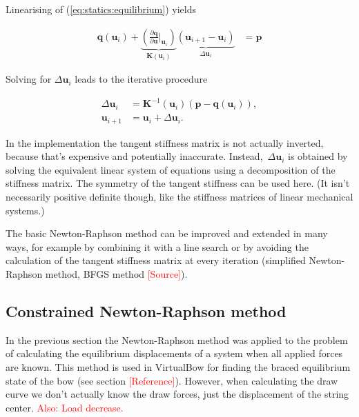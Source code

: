 Linearising of (\ref{eq:statics:equilibrium}) yields

\begin{align}
\boldsymbol{q}(\boldsymbol{u}_i) +
\underbrace{
\left(\frac{\partial \boldsymbol{q}}{\partial \boldsymbol{u}}\bigg \vert_{\boldsymbol{u}_i}\right)
}_{\boldsymbol{K}(\boldsymbol{u}_i)}
\underbrace{
(\boldsymbol{u}_{i+1} - \boldsymbol{u}_i)
}_{\Delta\boldsymbol{u}_i} &= \boldsymbol{p}
\end{align}

Solving for $\Delta\boldsymbol{u}_i$ leads to the iterative procedure

\begin{align}
\Delta\boldsymbol{u}_i &= \boldsymbol{K}^{-1}(\boldsymbol{u}_i)\left(\boldsymbol{p} - \boldsymbol{q}(\boldsymbol{u}_i)\right),\\
\boldsymbol{u}_{i+1} &= \boldsymbol{u}_i + \Delta\boldsymbol{u}_i.\label{eq:statics:newton_iteration}
\end{align}

In the implementation the tangent stiffness matrix is not actually inverted, because that's expensive and potentially inaccurate. Instead,~$\Delta\boldsymbol{u}_i$ is obtained by solving the equivalent linear system of equations using a decomposition of the stiffness matrix. The symmetry of the tangent stiffness can be used here. (It isn't necessarily positive definite though, like the stiffness matrices of linear mechanical systems.)

The basic Newton-Raphson method can be improved and extended in many ways, for example by combining it with a line search or by avoiding the calculation of the tangent stiffness matrix at every iteration (simplified Newton-Raphson method, BFGS method \textcolor{red}{[Source]}).

\subsection{Constrained Newton-Raphson method}

In the previous section the Newton-Raphson method was applied to the problem of calculating the equilibrium displacements of a system when all applied forces are known. This method is used in VirtualBow for finding the braced equilibrium state of the bow (see section \textcolor{red}{[Reference]}). However, when calculating the draw curve we don't actually know the draw forces, just the displacement of the string center. \textcolor{red}{Also: Load decrease.}

